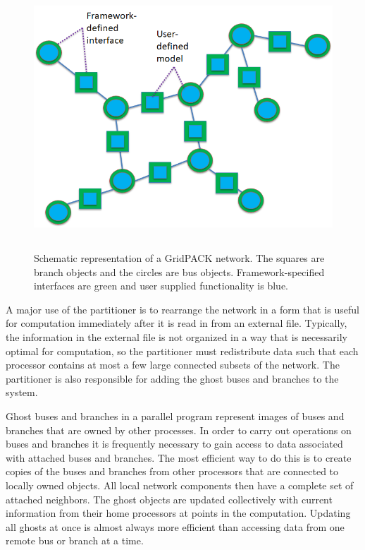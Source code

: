 \begin{figure}
  \centering
    \includegraphics*[width=5.52in, height=3.88in,
keepaspectratio=true]{figures/Grid-network}
  \caption{Schematic representation of a GridPACK network. The squares are branch objects and the circles are bus objects. Framework-specified interfaces are green and user supplied functionality is blue.}
  \label{fig:network}
\end{figure}

A major use of the partitioner is to rearrange the network in a form that is useful for computation immediately after it is read in from an external file. Typically, the information in the external file is not organized in a way that is necessarily optimal for computation, so the partitioner must redistribute data such that each processor contains at most a few large connected subsets of the network. The partitioner is also responsible for adding the ghost buses and branches to the system.

Ghost buses and branches in a parallel program represent images of buses and branches that are owned by other processes. In order to carry out operations on buses and branches it is frequently necessary to gain access to data associated with attached buses and branches. The most efficient way to do this is to create copies of the buses and branches from other processors that are connected to locally owned objects. All local network components then have a complete set of attached neighbors. The ghost objects are updated collectively with current information from their home processors at points in the computation. Updating all ghosts at once is almost always more efficient than accessing data from one remote bus or branch at a time.

